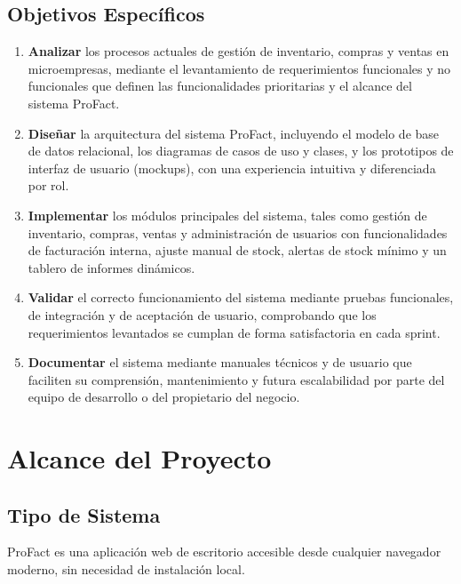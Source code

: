 \documentclass[12pt, letterpaper]{report}
\begin{document}
\section{Objetivos Específicos}

\begin{enumerate}
    \item \textbf{Analizar} los procesos actuales de gestión de inventario, compras y ventas en microempresas, mediante el levantamiento de requerimientos funcionales y no funcionales que definen las funcionalidades prioritarias y el alcance del sistema ProFact.
    \item \textbf{Diseñar} la arquitectura del sistema ProFact, incluyendo el modelo de base de datos relacional, los diagramas de casos de uso y clases, y los prototipos de interfaz de usuario (mockups), con una experiencia intuitiva y diferenciada por rol.
    \item \textbf{Implementar} los módulos principales del sistema, tales como gestión de inventario, compras, ventas y administración de usuarios con funcionalidades de facturación interna, ajuste manual de stock, alertas de stock mínimo y un tablero de informes dinámicos.
    \item \textbf{Validar} el correcto funcionamiento del sistema mediante pruebas funcionales, de integración y de aceptación de usuario, comprobando que los requerimientos levantados se cumplan de forma satisfactoria en cada sprint.
    \item \textbf{Documentar} el sistema mediante manuales técnicos y de usuario que faciliten su comprensión, mantenimiento y futura escalabilidad por parte del equipo de desarrollo o del propietario del negocio.
\end{enumerate}


\chapter{Alcance del Proyecto}

\section{Tipo de Sistema}

ProFact es una aplicación web de escritorio accesible desde cualquier navegador moderno, sin necesidad de instalación local.
\end{document}
